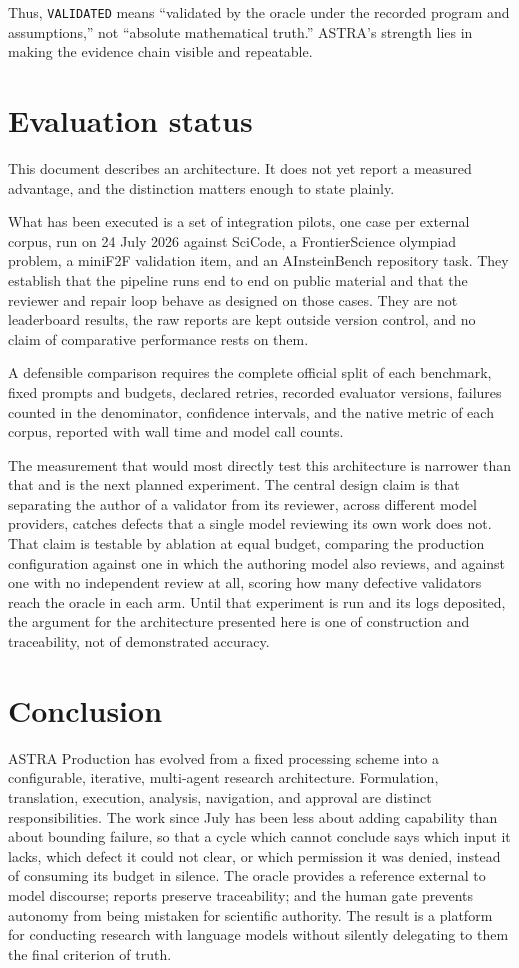 \documentclass[11pt,a4paper]{article}
\begin{document}
Thus, \texttt{VALIDATED} means ``validated by the oracle under the recorded program and assumptions,'' not ``absolute mathematical truth.'' ASTRA's strength lies in making the evidence chain visible and repeatable.

\section{Evaluation status}

This document describes an architecture. It does not yet report a measured advantage, and the distinction matters enough to state plainly.

What has been executed is a set of integration pilots, one case per external corpus, run on 24 July 2026 against SciCode, a FrontierScience olympiad problem, a miniF2F validation item, and an AInsteinBench repository task. They establish that the pipeline runs end to end on public material and that the reviewer and repair loop behave as designed on those cases. They are not leaderboard results, the raw reports are kept outside version control, and no claim of comparative performance rests on them.

A defensible comparison requires the complete official split of each benchmark, fixed prompts and budgets, declared retries, recorded evaluator versions, failures counted in the denominator, confidence intervals, and the native metric of each corpus, reported with wall time and model call counts.

The measurement that would most directly test this architecture is narrower than that and is the next planned experiment. The central design claim is that separating the author of a validator from its reviewer, across different model providers, catches defects that a single model reviewing its own work does not. That claim is testable by ablation at equal budget, comparing the production configuration against one in which the authoring model also reviews, and against one with no independent review at all, scoring how many defective validators reach the oracle in each arm. Until that experiment is run and its logs deposited, the argument for the architecture presented here is one of construction and traceability, not of demonstrated accuracy.

\section{Conclusion}

ASTRA Production has evolved from a fixed processing scheme into a configurable, iterative, multi-agent research architecture. Formulation, translation, execution, analysis, navigation, and approval are distinct responsibilities. The work since July has been less about adding capability than about bounding failure, so that a cycle which cannot conclude says which input it lacks, which defect it could not clear, or which permission it was denied, instead of consuming its budget in silence. The oracle provides a reference external to model discourse; reports preserve traceability; and the human gate prevents autonomy from being mistaken for scientific authority. The result is a platform for conducting research with language models without silently delegating to them the final criterion of truth.
\end{document}
